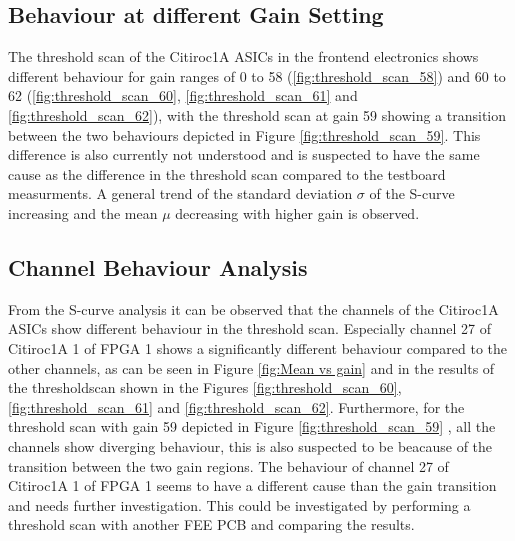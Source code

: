 \subsection{Behaviour at different Gain Setting}
The threshold scan of the Citiroc1A ASICs in the frontend electronics shows different behaviour for gain ranges of 0 to 58 (\ref{fig:threshold_scan_58}) and 60 to 62 (\ref{fig:threshold_scan_60}, \ref{fig:threshold_scan_61} and \ref{fig:threshold_scan_62}),
with the threshold scan at gain 59 showing a transition between the two behaviours depicted in Figure \ref{fig:threshold_scan_59}.
This difference is also currently not understood and is suspected to have the same cause as the difference in the threshold scan compared to the testboard measurments. 
\newline
A general trend of the standard deviation $\sigma$ of the S-curve increasing and the mean $\mu$ decreasing with higher gain is observed.
\subsection{Channel Behaviour Analysis}
From the S-curve analysis it can be observed that the channels of the Citiroc1A ASICs show different behaviour in the threshold scan.
\newline
Especially channel 27 of Citiroc1A 1 of FPGA 1 shows a significantly different behaviour compared to the other channels,
as can be seen in Figure \ref{fig:Mean vs gain} and in the results of the thresholdscan shown in the Figures \ref{fig:threshold_scan_60}, \ref{fig:threshold_scan_61} and \ref{fig:threshold_scan_62}.
\newline
Furthermore, for the threshold scan with gain 59 depicted in Figure \ref{fig:threshold_scan_59} , all the channels show diverging behaviour, this is also suspected to be beacause of the transition between the two gain regions.
\newline
The behaviour of channel 27 of Citiroc1A 1 of FPGA 1 seems to have a different cause than the gain transition and needs further investigation.
This could be investigated by performing a threshold scan with another FEE PCB and comparing the results.

